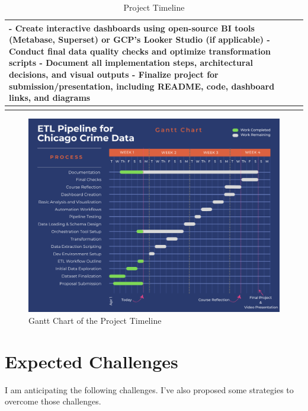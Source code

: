 \documentclass{article}
\begin{document}
\begin{longtable}{|L{2cm}|L{3cm}|L{10cm}|}
    - Create interactive dashboards using open-source BI tools (Metabase, Superset) or GCP’s Looker Studio (if applicable)\newline
    - Conduct final data quality checks and optimize transformation scripts\newline
    - Document all implementation steps, architectural decisions, and visual outputs\newline
    - Finalize project for submission/presentation, including README, code, dashboard links, and diagrams
    \\
    \hline
    \caption{Project Timeline}
    \label{tab:project-timeline}
\end{longtable}

\begin{figure}[H]
    \centering
    \includegraphics[width=1\textwidth]{images/gantt-chart.png}
    \caption{Gantt Chart of the Project Timeline}
    \label{fig:gantt-chart}
\end{figure}



\section{Expected Challenges}
I am anticipating the following challenges. I’ve also proposed some strategies to overcome those challenges. 
\end{document}
